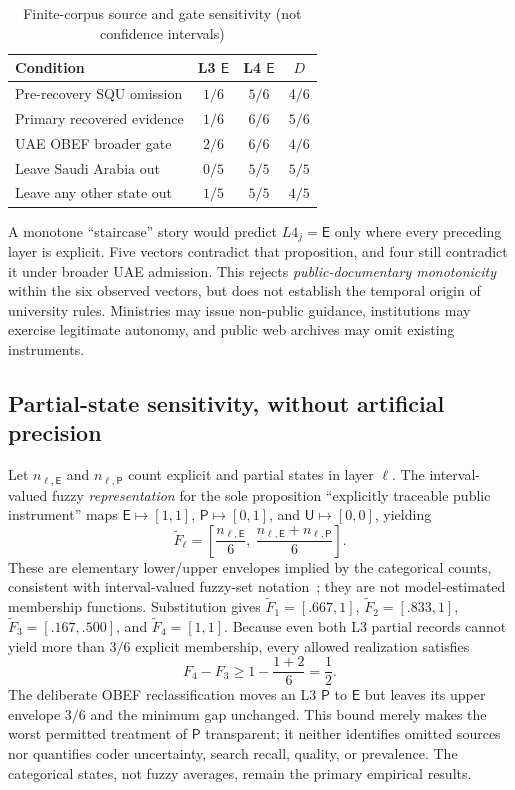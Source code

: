 \documentclass[conference,letterpaper]{IEEEtran}
\newcommand{\stE}{\textsf{E}}
\newcommand{\stP}{\textsf{P}}
\newcommand{\stU}{\textsf{U}}
\begin{document}
\begin{table}[t]
\centering\caption{Finite-corpus source and gate sensitivity (not confidence intervals)}\label{tab:robustness}
\footnotesize
\begin{tabularx}{\columnwidth}{@{}Xccc@{}}
\toprule
Condition & L3 $\stE$ & L4 $\stE$ & $D$\tabularnewline\midrule
Pre-recovery SQU omission & $1/6$ & $5/6$ & $4/6$\tabularnewline
Primary recovered evidence & $1/6$ & $6/6$ & $5/6$\tabularnewline
UAE OBEF broader gate & $2/6$ & $6/6$ & $4/6$\tabularnewline
Leave Saudi Arabia out & $0/5$ & $5/5$ & $5/5$\tabularnewline
Leave any other state out & $1/5$ & $5/5$ & $4/5$\tabularnewline
\bottomrule
\end{tabularx}
\end{table}

A monotone ``staircase'' story would predict $L4_j=\stE$ only where every preceding layer is explicit. Five vectors contradict that proposition, and four still contradict it under broader UAE admission. This rejects \emph{public-documentary monotonicity} within the six observed vectors, but does not establish the temporal origin of university rules. Ministries may issue non-public guidance, institutions may exercise legitimate autonomy, and public web archives may omit existing instruments.

\subsection{Partial-state sensitivity, without artificial precision}
Let $n_{\ell,\stE}$ and $n_{\ell,\stP}$ count explicit and partial states in layer $\ell$. The interval-valued fuzzy \emph{representation} for the sole proposition ``explicitly traceable public instrument'' maps $\stE\mapsto[1,1]$, $\stP\mapsto[0,1]$, and $\stU\mapsto[0,0]$, yielding
\begin{equation}\label{eq:fuzzy}
\widetilde F_\ell=\left[\frac{n_{\ell,\stE}}6,\ \frac{n_{\ell,\stE}+n_{\ell,\stP}}6\right].
\end{equation}
These are elementary lower/upper envelopes implied by the categorical counts, consistent with interval-valued fuzzy-set notation~\cite{petry,pekala}; they are not model-estimated membership functions. Substitution gives $\widetilde F_1=[.667,1]$, $\widetilde F_2=[.833,1]$, $\widetilde F_3=[.167,.500]$, and $\widetilde F_4=[1,1]$. Because even both L3 partial records cannot yield more than $3/6$ explicit membership, every allowed realization satisfies
\begin{equation}\label{eq:bound}
F_4-F_3\geq 1-\frac{1+2}{6}=\frac12.
\end{equation}
The deliberate OBEF reclassification moves an L3 $\stP$ to $\stE$ but leaves its upper envelope $3/6$ and the minimum gap unchanged. This bound merely makes the worst permitted treatment of $\stP$ transparent; it neither identifies omitted sources nor quantifies coder uncertainty, search recall, quality, or prevalence. The categorical states, not fuzzy averages, remain the primary empirical results.
\end{document}
